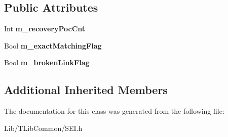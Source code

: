 \subsection*{Public Attributes}
\begin{DoxyCompactItemize}
\item 
\mbox{\label{class_s_e_i_recovery_point_af7326319ca880aa3cb257a59f5cd3ae8}} 
Int {\bfseries m\+\_\+recovery\+Poc\+Cnt}
\item 
\mbox{\label{class_s_e_i_recovery_point_aea0e47ac62be0aff0f906a3f624b8b42}} 
Bool {\bfseries m\+\_\+exact\+Matching\+Flag}
\item 
\mbox{\label{class_s_e_i_recovery_point_afc57e8ac41324b6ad4e7982d4d9ffebf}} 
Bool {\bfseries m\+\_\+broken\+Link\+Flag}
\end{DoxyCompactItemize}
\subsection*{Additional Inherited Members}


The documentation for this class was generated from the following file\+:\begin{DoxyCompactItemize}
\item 
Lib/\+T\+Lib\+Common/S\+E\+I.\+h\end{DoxyCompactItemize}
